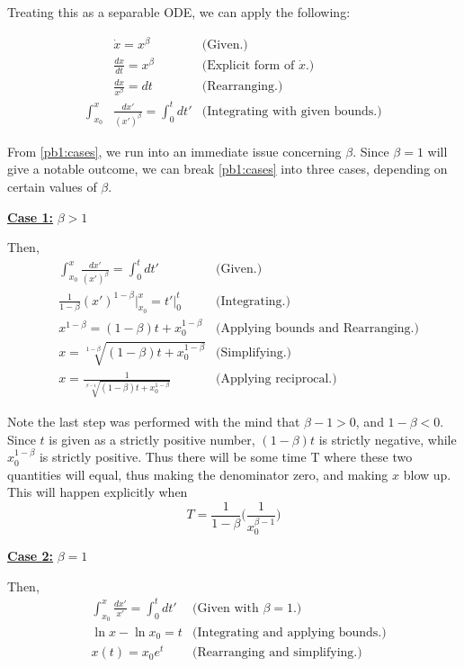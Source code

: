 \partbreak
\begin{solution}

Treating this as a separable ODE, we can apply the following:

\alignbreak
\begin{align}
&\dot{x} = x^\beta &\text{(Given.)} \nonumber\\
&\frac{dx}{dt} = x^\beta &\text{(Explicit form of $\dot{x}$.)} \nonumber\\
&\frac{dx}{x^\beta} = dt &\text{(Rearranging.)} \nonumber\\        
\int_{x_0}^x &\frac{dx'}{(x')^\beta} = \int_0^t dt' &\text{(Integrating with given bounds.)} \label{pb1:cases}
\end{align}
\alignbreak

From \ref{pb1:cases}, we run into an immediate issue concerning $\beta$. Since $\beta = 1$ will give a notable outcome, we can break \ref{pb1:cases} into three cases, depending on certain values of $\beta$.

\alignbreak

\underline{\textbf{Case 1:}} $\beta > 1$

Then, 
\begin{align}
 &\int_{x_0}^x \frac{dx'}{(x')^\beta} = \int_0^t dt' &\text{(Given.)}\nonumber\\
 &\frac{1}{1 - \beta}(x')^{1 - \beta}\bigg|_{x_0}^x = t' \bigg|_0^t &\text{(Integrating.)}\nonumber\\
&x^{1 - \beta} = (1 - \beta)t + x_0^{1 - \beta} &\text{(Applying bounds and Rearranging.)} \nonumber\\
&x = \sqrt[1 - \beta]{(1 - \beta)t + x_0^{1 - \beta}} &\text{(Simplifying.)}\nonumber\\
&x = \frac{1}{\sqrt[\beta - 1]{(1 - \beta)t + x_0^{1 - \beta}}} &\text{(Applying reciprocal.)} \nonumber
\end{align}

Note the last step was performed with the mind that $\beta - 1 > 0$, and $1 - \beta < 0$. Since $t$ is given as a strictly positive number, $(1 - \beta)t$ is strictly negative, while $x_0^{1 - \beta}$ is strictly positive. Thus there will be some time T where these two quantities will equal, thus making the denominator zero, and making $x$ blow up. This will happen explicitly when
\[T = \frac{1}{1 - \beta}\Bigg(\frac{1}{x_0^{\beta - 1}}\Bigg)\]

\underline{\textbf{Case 2:}} $\beta = 1$

Then,
\begin{align}
     &\int_{x_0}^x \frac{dx'}{x'} = \int_0^t dt' &\text{(Given with $\beta = 1$.)}\nonumber\\
    &\ln{x} - \ln x_0 = t &\text{(Integrating and applying bounds.)}\nonumber\\
    &x(t) = x_0e^t &\text{(Rearranging and simplifying.)}\nonumber\\
\end{align}


\end{solution}
